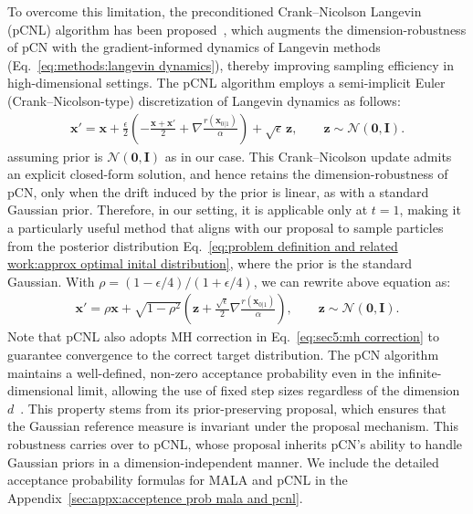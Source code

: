 To overcome this limitation, the preconditioned Crank–Nicolson Langevin (pCNL) algorithm has been proposed~\cite{Cotter_2013pcnl, Beskos_2017geometricMCMC}, which augments the dimension-robustness of pCN with the gradient-informed dynamics of Langevin methods (Eq.~\ref{eq:methods:langevin dynamics}), thereby improving sampling efficiency in high-dimensional settings.
The pCNL algorithm employs a semi-implicit Euler (Crank–Nicolson-type) discretization of Langevin dynamics as follows:
\begin{align}
    \mathbf{x}'=\mathbf{x}+\frac{\epsilon}{2}\left( -\frac{\mathbf{x}+\mathbf{x}'}{2}+ \nabla \frac{r(\mathbf{x}_{0|1})}{\alpha}\right)+\sqrt{\epsilon}\,\mathbf{z}, \qquad \mathbf{z}\sim \mathcal{N}(\mathbf{0}, \mathbf{I}).
\end{align}
assuming prior is $\mathcal{N}(\mathbf{0}, \mathbf{I})$ as in our case.
This Crank–Nicolson update admits an explicit closed-form solution, and hence retains the dimension-robustness of pCN, only when the drift induced by the prior is linear, as with a standard Gaussian prior. 
Therefore, in our setting, it is applicable only at $t=1$, making it a particularly useful method that aligns with our proposal to sample particles from the posterior distribution Eq.~\ref{eq:problem definition and related work:approx optimal inital distribution}, where the prior is the standard Gaussian.
With $\rho=(1-\epsilon/4)/(1+\epsilon/4)$, we can rewrite above equation as:
\begin{align}
    \label{eq:methods:pcnl version discretization of sde}
    \mathbf{x}'=\rho\mathbf{x}+\sqrt{1-\rho^2}\left( \mathbf{z}+\frac{\sqrt{\epsilon}}{2} \nabla \frac{r(\mathbf{x}_{0|1})}{\alpha}\right), \qquad \mathbf{z}\sim \mathcal{N}(\mathbf{0}, \mathbf{I}).
\end{align}
Note that pCNL also adopts MH correction in Eq.~\ref{eq:sec5:mh correction} to guarantee convergence to the correct target distribution. 
The pCN algorithm maintains a well-defined, non-zero acceptance probability even in the infinite-dimensional limit, allowing the use of fixed step sizes regardless of the dimension $d$~\cite{Cotter_2013pcnl, Beskos_2017geometricMCMC}. This property stems from its prior-preserving proposal, which ensures that the Gaussian reference measure is invariant under the proposal mechanism. This robustness carries over to pCNL, whose proposal inherits pCN’s ability to handle Gaussian priors in a dimension-independent manner. 
We include the detailed acceptance probability formulas for MALA and pCNL in the Appendix~\ref{sec:appx:acceptence prob mala and pcnl}. 

